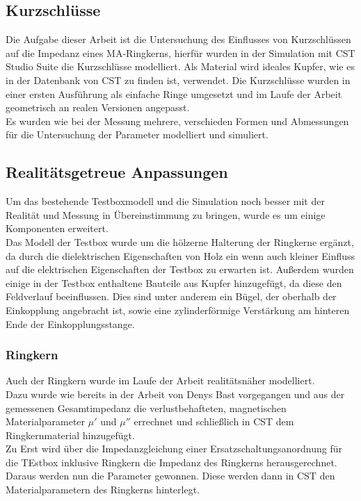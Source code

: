         \subsection{Kurzschlüsse}
        Die Aufgabe dieser Arbeit ist die Untersuchung des Einflusses von Kurzschlüssen auf die Impedanz eines MA-Ringkerns, hierfür wurden in der Simulation mit CST Studio Suite die Kurzschlüsse modelliert. Als Material wird ideales Kupfer, wie es in der Datenbank von CST zu finden ist, verwendet. Die Kurzschlüsse wurden in einer ersten Ausführung als einfache Ringe umgesetzt und im Laufe der Arbeit geometrisch an realen Versionen angepasst.\\
        Es wurden wie bei der Messung mehrere, verschieden Formen und Abmessungen für die Untersuchung der Parameter modelliert und simuliert.
        
        \subsection{Realitätsgetreue Anpassungen}
        Um das bestehende Testboxmodell und die Simulation noch besser mit der Realität und Messung in Übereinstimmung zu bringen, wurde es um einige Komponenten erweitert.\\
        Das Modell der Testbox wurde um die hölzerne Halterung der Ringkerne ergänzt, da durch die dielektrischen Eigenschaften von Holz ein wenn auch kleiner Einfluss auf die elektrischen Eigenschaften der Testbox zu erwarten ist. Außerdem wurden einige in der Testbox enthaltene Bauteile aus Kupfer hinzugefügt, da diese den Feldverlauf beeinflussen. Dies sind unter anderem ein Bügel, der oberhalb der Einkopplung angebracht ist, sowie eine zylinderförmige Verstärkung am hinteren Ende der Einkopplungsstange.
        
            \subsubsection{Ringkern}
            Auch der Ringkern wurde im Laufe der Arbeit realitätsnäher modelliert.\\
            Dazu wurde wie bereits in der Arbeit von Denys Bast vorgegangen und aus der gemessenen Gesamtimpedanz die verlustbehafteten, magnetischen Materialparameter $\mu'$ und $\mu''$ errechnet und schließlich in CST dem Ringkernmaterial hinzugefügt.\\
            Zu Erst wird über die Impedanzgleichung einer Ersatzschaltungsanordnung für die TEstbox inklusive Ringkern die Impedanz des Ringkerns herausgerechnet. Daraus werden nun die Parameter gewonnen. Diese werden dann in CST den Materialparametern des Ringkerns hinterlegt.
